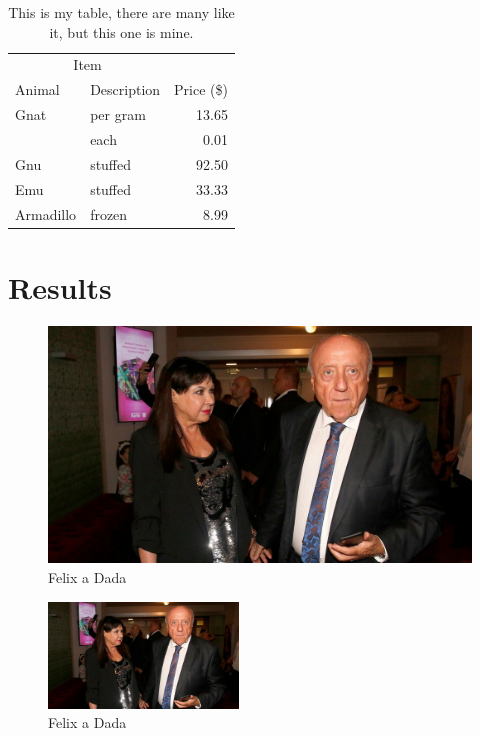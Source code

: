 \documentclass[a4paper,conference]{IEEEtran}
\begin{document}
\lipsum[8]

\begin{table}
    \centering
    \caption{This is my table, there are many like it, but this one is mine.}
    \label{tbl:mytable2}
    \begin{tabular}{llr}
    \toprule
    \multicolumn{2}{c}{Item} \\
    \cmidrule(r){1-2}
    Animal & Description & Price (\$) \\
    \midrule
    Gnat  & per gram & 13.65 \\
          & each     &  0.01 \\
    Gnu   & stuffed  & 92.50 \\
    Emu   & stuffed  & 33.33 \\
    Armadillo & frozen & 8.99 \\
    \bottomrule
    \end{tabular}
\end{table}
    

\section{Results}

\lipsum[3]

\begin{figure}
    \centering
    \includegraphics[width=\textwidth]{img/felixdada.jpg}
    \caption{Felix a Dada}
    \label{fig:attack_success_rate2}
\end{figure}

\lipsum[3]


\begin{figure}
    \centering
    \includegraphics[width=0.45\textwidth]{img/felixdada.jpg}
    \caption{Felix a Dada}
    \label{fig:attack_success_rate}
\end{figure}

\lipsum[1-10]


\printbibliography
\end{document}
